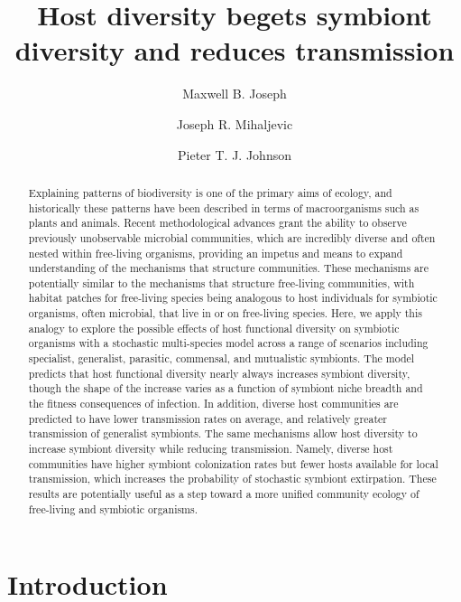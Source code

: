 \documentclass[12pt]{article}
\title{Host diversity begets symbiont diversity and reduces transmission}
\author[1]{Maxwell B. Joseph}
\author[2]{Joseph R. Mihaljevic}
\author[1]{Pieter T. J. Johnson}
\affil[1]{Ecology and Evolutionary Biology, University of Colorado, Boulder, CO}
\affil[2]{Ecology and Evolution, University of Chicago, IL}
\date{}
\begin{document}
\maketitle

\begin{abstract}
Explaining patterns of biodiversity is one of the primary aims of ecology, and historically these patterns have been described in terms of macroorganisms such as plants and animals. 
Recent methodological advances grant the ability to observe previously unobservable microbial communities, which are incredibly diverse and often nested within free-living organisms, providing an impetus and means to expand understanding of the mechanisms that structure communities. 
These mechanisms are potentially similar to the mechanisms that structure free-living communities, with habitat patches for free-living species being analogous to host individuals for symbiotic organisms, often microbial, that live in or on free-living species.
Here, we apply this analogy to explore the possible effects of host functional diversity on symbiotic organisms with a stochastic multi-species model across a range of scenarios including specialist, generalist, parasitic, commensal, and mutualistic symbionts. 
The model predicts that host functional diversity nearly always increases symbiont diversity, though the shape of the increase varies as a function of symbiont niche breadth and the fitness consequences of infection. 
In addition, diverse host communities are predicted to have lower transmission rates on average, and relatively greater transmission of generalist symbionts. 
The same mechanisms allow host diversity to increase symbiont diversity while reducing transmission.
Namely, diverse host communities have higher symbiont colonization rates but fewer hosts available for local transmission, which increases the probability of stochastic symbiont extirpation.
These results are potentially useful as a step toward a more unified community ecology of free-living and symbiotic organisms.
\end{abstract}

\section*{Introduction}
\end{document}

